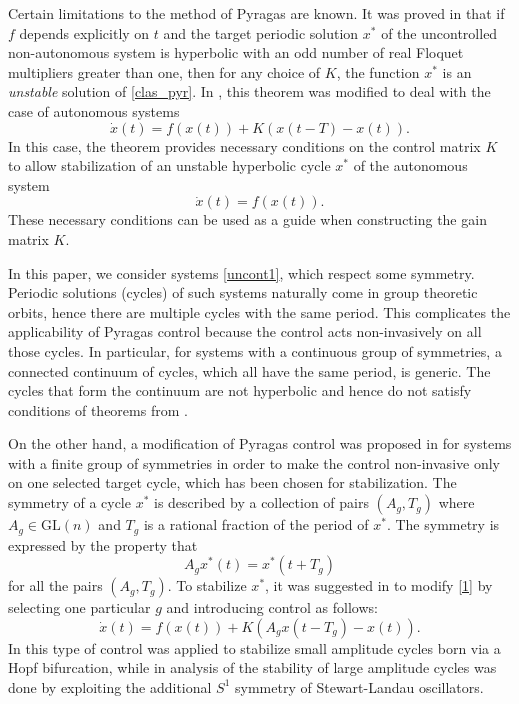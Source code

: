 \documentclass{article}
\begin{document}
Certain limitations to the method of Pyragas are known.
It was proved in \cite{original_odd} that if $f$ depends explicitly on $t$ and
the target periodic solution $x^*$ of the uncontrolled non-autonomous system
is hyperbolic with an odd number of real Floquet multipliers greater than one, then for any choice of $K$,
the function $x^*$ is an {\em unstable} solution of \eqref{clas_pyr}.
In \cite{hooton_amann}, this theorem was modified to deal with the case of autonomous systems
\begin{equation}\label{1}
\dot x(t) = f(x(t))+ K(x(t-T)-x(t)).
\end{equation}
In this case, the theorem provides necessary conditions on the control matrix $K$ to allow stabilization
of an unstable hyperbolic cycle $x^*$ of the autonomous system
\begin{equation}\label{uncont1}
\dot{x}(t)=f(x(t)).
\end{equation}
These necessary conditions can be used as a guide when constructing the gain matrix $K$.

In this paper, we consider systems \eqref{uncont1}, which respect some symmetry.
Periodic solutions (cycles) of such systems naturally come in group theoretic orbits, hence there are multiple cycles with the same period.
This complicates the applicability of Pyragas control because the control acts non-invasively on all those cycles.
In particular, for systems with a continuous group of symmetries, a connected continuum of cycles, which all have the same period, is generic.
The cycles that form the continuum are not hyperbolic and hence do not satisfy
conditions of theorems from \cite{original_odd, hooton_amann}.

On the other hand, a modification of Pyragas control was proposed in \cite{fiedler_Z_2} for systems with a finite group of symmetries
in order to make the control non-invasive only on one selected target cycle, which has been chosen for stabilization.
The symmetry of a cycle $x^*$ is described by a collection of pairs $(A_g,T_g)$ where $A_g \in \text{GL}(n)$ and $T_g$ is a rational fraction of the period of $x^*$. The symmetry is expressed by the property that
\begin{equation}\label{sym_prop2}
A_gx^*(t)= x^*(t+T_g)
\end{equation}
for all the pairs $(A_g,T_g)$.
To stabilize $x^*$, it was suggested in \cite{Isabelle_thesis} to modify \eqref{1} by selecting one particular $g$
and introducing control as follows:
\begin{equation}\label{fied_cont}
\dot x(t) = f(x(t))+ K(A_gx(t-T_g)-x(t)).
\end{equation}
In \cite{fiedler_Z_2,mamanya1, mamanya_physica_d} this type of control was applied to stabilize small amplitude cycles born via a Hopf bifurcation, while in \cite{baryshnya_book_chapter} analysis of the stability of large amplitude cycles was done by exploiting the additional $S^1$ symmetry of Stewart-Landau oscillators.
\end{document}

